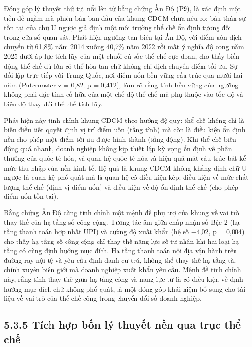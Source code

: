 \documentclass[
  a4paper,
  13pt]{extreport}
\begin{document}
Đóng góp lý thuyết thứ tư, nổi lên từ bằng chứng Ấn Độ (P9), là xác định
một tiền đề ngầm mà phiên bản ban đầu của khung CDCM chưa nêu rõ: bản
thân sự tồn tại của chữ U ngược giả định một môi trường thể chế ổn định
tương đối trong cửa sổ quan sát. Phát hiện ngưỡng tan biến tại Ấn Độ,
với điểm uốn dịch chuyển từ 61,8\% năm 2014 xuống 40,7\% năm 2022 rồi
mất ý nghĩa độ cong năm 2025 dưới áp lực tích lũy của một chuỗi cú sốc
thể chế cực đoan, cho thấy biến động thể chế đủ lớn có thể hòa tan chứ
không chỉ dịch chuyển điểm tối ưu. Sự đối lập trực tiếp với Trung Quốc,
nơi điểm uốn bền vững cấu trúc qua mười hai năm (Paternoster z = 0,82, p
= 0,412), làm rõ rằng tính bền vững của ngưỡng không phải đặc tính cố
hữu của một chế độ thể chế mà phụ thuộc vào tốc độ và biên độ thay đổi
thể chế tích lũy.

Phát hiện này tinh chỉnh khung CDCM theo hướng đệ quy: thể chế không chỉ
là biến điều tiết quyết định vị trí điểm uốn (tầng tĩnh) mà còn là điều
kiện ổn định nền cho phép một điểm tối ưu được hình thành (tầng động).
Khi thể chế biến động quá nhanh, doanh nghiệp không kịp thiết lập kỳ
vọng ổn định về phần thưởng của quốc tế hóa, và quan hệ quốc tế hóa và
hiệu quả mất cấu trúc bất kể mức thu nhập của nền kinh tế. Hệ quả là
khung CDCM không khẳng định chữ U ngược là quan hệ phổ quát mà là quan
hệ có điều kiện kép: điều kiện về mức chất lượng thể chế (định vị điểm
uốn) và điều kiện về độ ổn định thể chế (cho phép điểm uốn tồn tại).

Bằng chứng Ấn Độ cũng tinh chỉnh một mệnh đề phụ trợ của khung về vai
trò thay thế của hạ tầng số công cộng. Tương tác âm giữa chấp nhận số
Bậc 2 (hạ tầng thanh toán hợp nhất UPI) và cường độ xuất khẩu (hệ số
−4,02, p = 0,004) cho thấy hạ tầng số công cộng chỉ thay thế năng lực số
tư nhân khi hai loại hạ tầng có cùng định hướng mục đích. Hạ tầng thanh
toán nội địa vận hành trên đường ray nội tệ và yêu cầu định danh cư trú,
không thể thay thế hạ tầng tài chính xuyên biên giới mà doanh nghiệp
xuất khẩu yêu cầu. Mệnh đề tinh chỉnh này, rằng tính thay thế giữa hạ
tầng công và năng lực tư là có điều kiện về định hướng mục đích chứ
không phổ quát, là một đóng góp khái niệm bổ sung cho tài liệu về vai
trò của thể chế công trong chuyển đổi số doanh nghiệp.

\hypertarget{tuxedch-hux1ee3p-bux1ed1n-luxfd-thuyux1ebft-nux1ec1n-qua-trux1ee5c-thux1ec3-chux1ebf}{%
\subsection{5.3.5 Tích hợp bốn lý thuyết nền qua trục thể
chế}\label{tuxedch-hux1ee3p-bux1ed1n-luxfd-thuyux1ebft-nux1ec1n-qua-trux1ee5c-thux1ec3-chux1ebf}}
\end{document}
